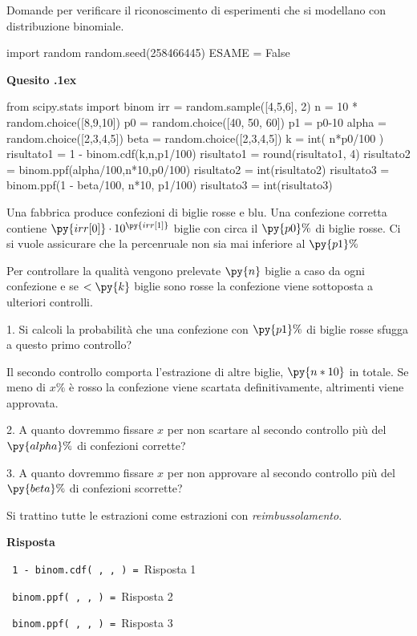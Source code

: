 \documentclass[11pt,twoside,a4paper]{article}
\newcounter{quesito}
\newenvironment{question}{\bigskip\addtocounter{quesito}{1}\bigskip\bigskip\par\textbf{Quesito \thequesito.\kern1ex}}{\vspace{\parskip}}
\newenvironment{answer}{\par\textbf{Risposta\quad}}{\vspace{\parskip}}
\begin{document}
\colorbox{blue!10}{\begin{minipage}{\textwidth}
Domande  per verificare il riconoscimento di esperimenti che si modellano con distribuzione binomiale.
\end{minipage}}

\bigskip\bigskip


\begin{pycode}
import random
random.seed(258466445)
ESAME = False
\end{pycode}


\begin{question}
\def\Pr{{\rm Pr\,}}
\def\Ex{{\rm E\,}}
\def\Var{{\rm Var\,}}
\begin{pycode}
from scipy.stats import binom
irr = random.sample([4,5,6], 2)
n = 10 * random.choice([8,9,10])
p0 = random.choice([40, 50, 60])
p1 = p0-10
alpha =  random.choice([2,3,4,5])
beta =  random.choice([2,3,4,5])
k = int( n*p0/100 )
risultato1 = 1 - binom.cdf(k,n,p1/100)
risultato1 = round(risultato1, 4)
risultato2 = binom.ppf(alpha/100,n*10,p0/100)
risultato2 = int(risultato2)
risultato3 = binom.ppf(1 - beta/100, n*10, p1/100)
risultato3 = int(risultato3)
\end{pycode}
Una fabbrica produce confezioni di biglie rosse e blu. Una confezione corretta contiene $\py{irr[0]}\cdot 10^{\py{irr[1]}}$ biglie con circa il $\py{p0}\%$ di biglie rosse. Ci si vuole assicurare che la percenruale non sia mai inferiore al $\py{p1}\%$

Per controllare la qualità vengono prelevate $\py{n}$ biglie a caso da ogni confezione e se $<\py{k}$ biglie sono rosse la confezione viene sottoposta a ulteriori controlli.

1. Si calcoli la probabilità che una confezione con $\py{p1}\%$ di biglie rosse sfugga a questo primo controllo?

Il secondo controllo comporta l'estrazione di altre biglie,  $\py{n*10}$ in totale. Se meno di $x\%$ è rosso la confezione viene scartata definitivamente, altrimenti viene approvata.

2. A quanto dovremmo fissare $x$ per non scartare al secondo controllo più del $\py{alpha}\%$ di confezioni corrette?

3. A quanto dovremmo fissare $x$ per non approvare al secondo controllo più del $\py{beta}\%$ di confezioni scorrette?

Si trattino tutte le estrazioni come estrazioni con \textit{reimbussolamento}.

\begin{answer}

{\tt {\color{blue} 1 - binom.cdf( , ,  )} = }\hfill  {\color{blue}Risposta 1}

{\tt {\color{blue} binom.ppf( , ,  )} = }\hfill  {\color{blue}Risposta 2}

{\tt {\color{blue} binom.ppf( , ,  )} = }\hfill {\color{blue}Risposta 3}

\end{answer}
\end{question}
\end{document}
